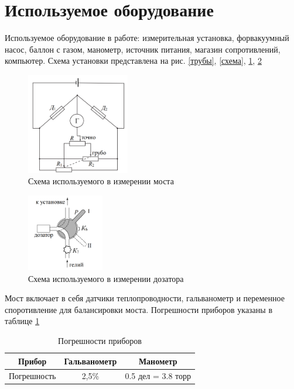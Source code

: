 \documentclass[a4paper,12pt]{article} %
\begin{document}
\section{Используемое оборудование}
Используемое оборудование в работе:
измерительная установка, форвакуумный насос, баллон с газом,  манометр, источник питания, магазин сопротивлений, компьютер.
Схема установки представлена на рис. \ref{трубы}, \ref{схема}, \ref{мост}, \ref{дозатор}
\begin{figure}[h!]
\begin{center}
\includegraphics[width=0.4\textwidth]{Мост}
\end{center}
\caption{Схема используемого в измерении моста} \label{мост}
\end{figure}
\begin{figure}[h!]
\begin{center}
\includegraphics[width=0.3\textwidth]{Дозатор}
\end{center}
\caption{Схема используемого в измерении дозатора} \label{дозатор}
\end{figure}
Мост включает в себя датчики теплопроводности, гальванометр и переменное споротивление для балансировки моста.
Погрешности приборов указаны в таблице \ref{погрешности}
\begin{table} \label{погрешности} \caption{Погрешности приборов}
\begin{tabular}{|c|c|c|}
\hline 
Прибор & Гальванометр & Манометр \\ 
\hline 
Погрешность & 2,5\%  & 0.5 дел = 3.8 торр \\ 
\hline 
\end{tabular} 
\end{table}
\end{document}

